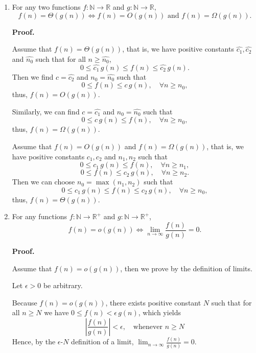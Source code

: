 \documentclass[12pt]{article}
\begin{document}
\begin{enumerate}
    \item For any two functions \(f : \mathbb{N} \to \mathbb{R}\) and \(g : \mathbb{N} \to \mathbb{R}\),
    \[
        f(n) = \Theta(g(n)) \Longleftrightarrow f(n) = O(g(n)) \text{ and } f(n) = \Omega(g(n)).
    \]

    \textbf{Proof.}

    \fbox{\(\Longrightarrow\)}

    Assume that \(f(n) = \Theta(g(n))\), that is, we have positive constants \(\hat{c_1}, \hat{c_2}\) and \(\hat{n_0}\) such that for all \(n \geq \hat{n_0}\),
    \[
        0 \leq \hat{c_1} \, g(n) \leq f(n) \leq \hat{c_2} \, g(n).
    \]
    Then we find \(c = \hat{c_2}\) and \(n_0 = \hat{n_0}\) such that
    \[
        0 \leq f(n) \leq c \, g(n), \quad \forall n \geq n_0,
    \]
    thus, \(f(n) = O(g(n))\).

    Similarly, we can find \(c = \hat{c_1}\) and \(n_0 = \hat{n_0}\) such that
    \[
        0 \leq c \, g(n) \leq f(n), \quad \forall n \geq n_0,
    \]
    thus, \(f(n) = \Omega(g(n))\).

    \newpage

    \fbox{\(\Longleftarrow\)}

    Assume that \(f(n) = O(g(n))\) and \(f(n) = \Omega(g(n))\), that is, we have positive constants \(c_1, c_2\) and \(n_1, n_2\) such that
    \[
        0 \leq c_1 \, g(n) \leq f(n), \quad \forall n \geq n_1,
    \]
    \[
        0 \leq f(n) \leq c_2 \, g(n), \quad \forall n \geq n_2.
    \]
    Then we can choose \(n_0 = \max(n_1, n_2)\) such that
    \[
        0 \leq c_1 \, g(n) \leq f(n) \leq c_2 \, g(n), \quad \forall n \geq n_0,
    \]
    thus, \(f(n) = \Theta(g(n))\).

    \item For any functions \(f : \mathbb{N} \to \mathbb{R}^+\) and \(g : \mathbb{N} \to \mathbb{R}^+\),
    \[
        f(n) = o(g(n)) \Longleftrightarrow \lim_{n \to \infty} \frac{f(n)}{g(n)} = 0.
    \]
    

    \textbf{Proof.}

    \fbox{\(\Longrightarrow\)}

    Assume that \(f(n) = o(g(n))\), then we prove by the definition of limits.

    Let \(\epsilon > 0\) be arbitrary.

    Because \(f(n) = o(g(n))\), there exists positive constant \(N\) such that for all \(n \geq N\) we have \(0 \leq f(n) < \epsilon \, g(n)\), which yields
    \[
        \left|\frac{f(n)}{g(n)}\right| < \epsilon, \quad \text{whenever } n \geq N
    \]
    Hence, by the \(\epsilon\)-\(N\) definition of a limit, \(\displaystyle\lim_{n \to \infty} \frac{f(n)}{g(n)} = 0\).


\end{enumerate}
\end{document}
